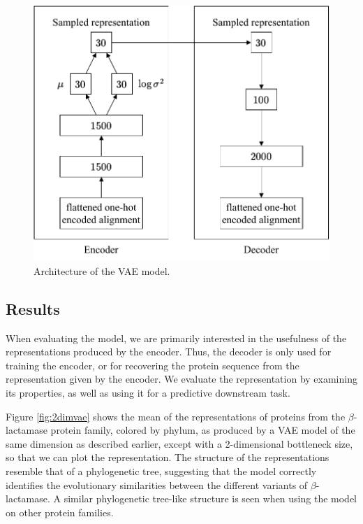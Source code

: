 \begin{figure}[ht]
    \centering
    \includegraphics{report/figures/VAE_architecture.pdf}
    \caption{Architecture of the VAE model.}
    \label{fig:vae_architecture}
\end{figure}

\subsection{Results}
When evaluating the model, we are primarily interested in the usefulness of the representations produced by the encoder. Thus, the decoder is only used for training the encoder, or for recovering the protein sequence from the representation given by the encoder. We evaluate the representation by examining its properties, as well as using it for a predictive downstream task.

Figure \ref{fig:2dimvae} shows the mean of the representations of proteins from the $\beta$-lactamase protein family, colored by phylum, as produced by a VAE model of the same dimension as described earlier, except with a 2-dimensional bottleneck size, so that we can plot the representation. The structure of the representations resemble that of a phylogenetic tree, suggesting that the model correctly identifies the evolutionary similarities between the different variants of $\beta$-lactamase. A similar phylogenetic tree-like structure is seen when using the model on other protein families.

